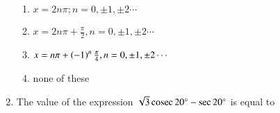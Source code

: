 \documentclass[journal,12pt,twocolumn]{IEEEtran}
\theoremstyle{remark}
\begin{document}
\begin{enumerate}
		\begin{enumerate}[label=(\alph*)]
			\item $x=2n\pi;n=0,\pm1,\pm2 \cdots$
			\item  $x = 2n\pi + \frac{\pi}{2}, n = 0, \pm 1, \pm 2 \cdots $
			\item $x=n\pi+\left(-1\right)^{n}\frac{\pi}{4},n = 0,\pm 1,\pm 2 \cdots $ 
			\item none of these
		\end{enumerate}
  


	\item The value of the expression $\sqrt{3}\,\text{cosec}\, 20^{\circ} - \sec 20^{\circ} $ is equal to 
		\begin{flushright}
		\end{flushright}
  
			\begin{enumerate}[label=(\alph*)]
			\end{enumerate}
  
  
\end{enumerate}
\end{document}
